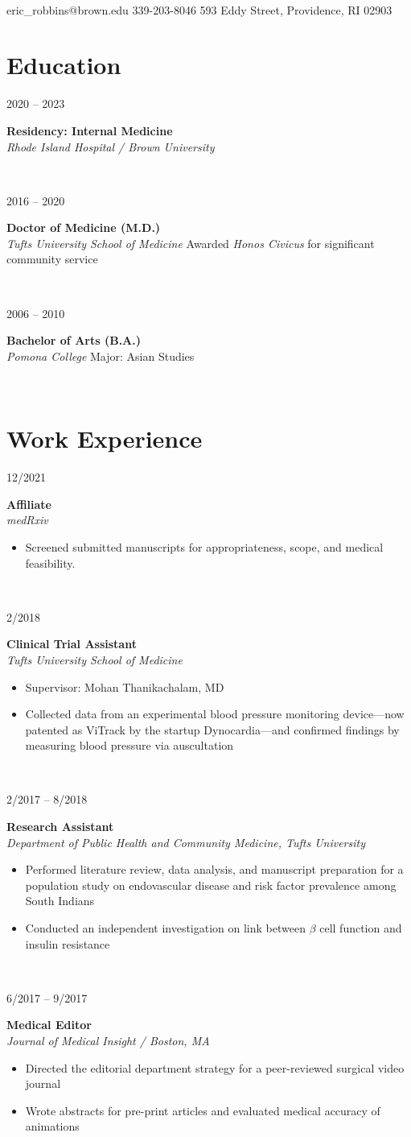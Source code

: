 \documentclass{book}
\makeatletter
\newcommand{\entryvspace}{\vspace{0.5em}}
\newcommand{\residency}{Rhode Island Hospital / Brown University}
\newcommand{\medschool}{Tufts University School of Medicine}
\newcommand{\undergrad}{Pomona College}
\newcommand{\cphone}{339-203-8046}
\newcommand{\address}{593 Eddy Street, Providence, RI 02903}
\newcommand{\email}{eric\_robbins@brown.edu}
\newcommand\mohan{Mohan Thanikachalam, MD}
\newcommand\colleft{.20}
\newcommand\colright{.75}
\newcommand{\entryfour}[4]
{
	\begin{minipage}[t]{\colleft\textwidth}
		\hfill \textsc{#1}
	\end{minipage}
	\hfill\vline\hfill
	\begin{minipage}[t]{\colright\textwidth}
		{\bf#2}\\
		\textit{#3}
		\footnotesize{#4}
	\end{minipage}\\
	\entryvspace
}%
\renewcommand{\maketitle}{
	\begin{center}
		{\huge\bfseries\theauthor}
		\vspace{0.25em}\\
		\email
		\hspace{1em}\vline \hspace{1em}%
		\cphone
		\hspace{1em}\vline \hspace{1em}
		\address
	\end{center}
}
\makeatother
\begin{document}
	\maketitle
	\section*{Education}
		\entryfour{2020 -- 2023}
			{Residency: Internal Medicine}
			{\residency}
			{}
			
		\entryfour{2016 -- 2020}
			{Doctor of Medicine (M.D.)}
			{\medschool}
			{Awarded \textit{Honos Civicus} for significant community service}
			
		\entryfour{2006 -- 2010}
		{Bachelor of Arts (B.A.)}
		{\undergrad}
		{Major: Asian Studies}
	\section*{Work Experience}
		\entryfour{12/2021}{Affiliate}{medRxiv}{%
			\begin{itemize}
				\item Screened submitted manuscripts for appropriateness, scope, and medical feasibility.
			\end{itemize}
			}

		\entryfour{2/2018}{Clinical Trial Assistant}{\medschool}{%
		 \begin{itemize}
		 	\item Supervisor: \mohan
		 	\item Collected data from an experimental blood pressure monitoring device—now patented as ViTrack by the startup Dynocardia—and confirmed findings by measuring blood pressure via auscultation
		 \end{itemize}
	 	}
		
		\entryfour{2/2017 -- 8/2018}{Research Assistant}{Department of Public Health and Community Medicine, Tufts University}{%
		\begin{itemize}
			\item Performed literature review, data analysis, and manuscript preparation for a population study on endovascular disease and risk factor prevalence among South Indians
			\item Conducted an independent investigation on link between $\beta$ cell function and insulin resistance
		\end{itemize}
	}

		\entryfour{6/2017 -- 9/2017}{Medical Editor}{Journal of Medical Insight / Boston, MA}{%
		\begin{itemize}
			\item Directed the editorial department strategy for a peer-reviewed surgical video journal
			\item Wrote abstracts for pre-print articles and evaluated medical accuracy of animations
		\end{itemize}
		}
		
\end{document}
